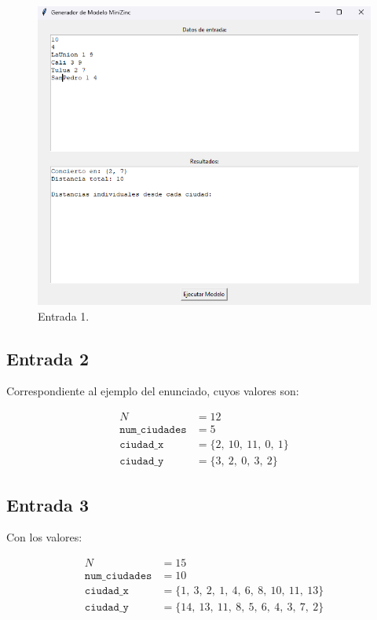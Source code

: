 \documentclass[conference]{IEEEtran}
\begin{document}
\begin{figure}[h]
	\centering
	\includegraphics[width=1.0\linewidth]{images/entrada1}
	\caption{Entrada 1.}
	\label{fig:entrada1}
\end{figure}

\subsection{Entrada 2}

Correspondiente al ejemplo del enunciado, cuyos valores son:

\begin{align*}
	N &= 12 \\
	\texttt{num\_ciudades} &= 5 \\
	\texttt{ciudad\_x} &= \{2,\ 10,\ 11,\ 0,\ 1\} \\
	\texttt{ciudad\_y} &= \{3,\ 2,\ 0,\ 3,\ 2\}
\end{align*}

\subsection{Entrada 3}

Con los valores:

\begin{align*}
	N &= 15 \\
	\texttt{num\_ciudades} &= 10 \\
	\texttt{ciudad\_x} &= \{1,\ 3,\ 2,\ 1,\ 4,\ 6,\ 8,\ 10,\ 11,\ 13\} \\
	\texttt{ciudad\_y} &= \{14,\ 13,\ 11,\ 8,\ 5,\ 6,\ 4,\ 3,\ 7,\ 2\}
\end{align*}
\end{document}
